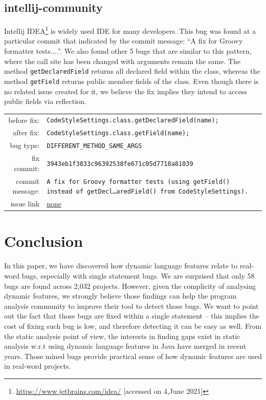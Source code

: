\documentclass[sigconf,review,anonymous]{acmart}
\begin{document}
\subsection{intellij-community}
Intellij IDEA\footnote{\url{https://www.jetbrains.com/idea/} [accessed on 4,June 2021]} is widely used IDE for many developers. This bug was found at a particular commit that indicated by the commit message: ``A fix for Groovy formatter tests....''.  We also found other 5 bugs that are similar to this pattern, where the call site has been changed with arguments remain the same. The method \texttt{getDeclaredField} \cite{javaclassapi} returns all declared field within the class, whereas the method \texttt{getField} \cite{javaclassapi} returns public member fields of the class. Even though there is no related issue created for it, we believe the fix implies they intend to access public fields via reflection.
\begin{table}[h!]
  \footnotesize
  \label{tab:intellij}
  \begin{tabular}{rp{5cm}}
    before fix:  &  \footnotesize{\texttt{CodeStyleSettings.class.getDeclaredField(name);}} \\
    after fix:  &  \footnotesize{\texttt{CodeStyleSettings.class.getField(name);}} \\
    bug type:   &  \texttt{DIFFERENT\_METHOD\_SAME\_ARGS} \\
    fix commit: &  \texttt{3943eb1f3833c96392538fe671c05d7718a81039} \\
    commit message:   &  \texttt{A fix for Groovy formatter tests (using getField() instead of getDecl…aredField() from CodeStyleSettings).}\\
    issue link &  \url{none}
  \end{tabular}
\end{table}

\section{Conclusion}

In this paper, we have discovered how dynamic language features relate to real-word bugs, especially with single statement bugs. We are surprised that only 58 bugs are found across 2,032 projects. However, given the complicity of analysing dynamic features, we strongly believe those findings can help the program analysis community to improve their tool to detect those bugs.  We want to point out the fact that those bugs are fixed within a single statement -- this implies the cost of fixing such bug is low, and therefore detecting it can be easy as well. From the static analysis point of view, the interests in finding gaps exist in static analysis w.r.t using dynamic language features in Java \cite{sui2020recall} have merged in recent years.  Those mined bugs provide practical sense of how dynamic features are used in real-word projects.
\end{document}
